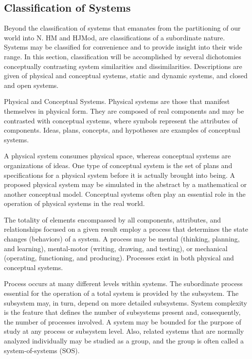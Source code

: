 \subsection{Classification of Systems}

Beyond the classification of systems that emanates from the partitioning of our world into N. HM and HJMod, are classifications of a subordinate nature. Systems may be classified for convenience and to provide insight into their wide range. In this section, classification will be accomplished by several dichotomies conceptually contrasting system similarities and dissimilarities. Descriptions are given of physical and conceptual systems, static and dynamic systems, and closed and open systems.

Physical and Conceptual Systems. Physical systems are those that manifest themselves in physical form. They are composed of real components and may be contrasted with conceptual systems, where symbols represent the attributes of components. Ideas, plans, concepts, and hypotheses are examples of conceptual systems.

A physical system consumes physical space, whereas conceptual systems are organizations of ideas. One type of conceptual system is the set of plans and specifications for a physical system before it is actually brought into being. A proposed physical system may be simulated in the abstract by a mathematical or another conceptual model. Conceptual systems often play an essential role in the operation of physical systems in the real world.

The totality of elements encompassed by all components, attributes, and relationships focused on a given result employ a process that determines the state changes (behaviors) of a system. A process may be mental (thinking, planning, and learning), mental-motor (writing, drawing, and testing), or mechanical (operating, functioning, and producing). Processes exist in both physical and conceptual systems.

Process occurs at many different levels within systems. The subordinate process essential for the operation of a total system is provided by the subsystem. The subsystem may, in turn, depend on more detailed subsystems. System complexity is the feature that defines the number of subsystems present and, consequently, the number of processes involved. A system may be bounded for the purpose of study at any process or subsystem level. Also, related systems that are normally analyzed individually may be studied as a group, and the group is often called a system-of-systems (SOS).

